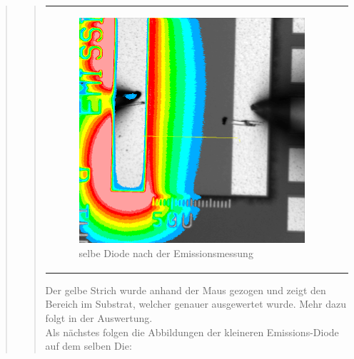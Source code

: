 \begin{quote}
\begin{quote}
\begin{center}
\begin{tabular}{ll}
\begin{minipage}{0.6\textwidth}
                         \begin{figure}[H]
                            \label{fig:asdfasdf}
                            \includegraphics[scale=0.25, trim = 0cm 0cm 0cm
                            0cm,
                            clip]{./Emissionsbilder/eins/nach_Emission_mit_Distanzen.png}
                            \caption{selbe Diode nach der Emissionsmessung}
                        \end{figure}
                   \vspace{-1.5em}

                    \end{minipage}

                \end{tabular}
                \end{center}

        \vspace{2em}

        Der gelbe Strich wurde anhand der Maus gezogen und zeigt den Bereich im
        Substrat, welcher genauer ausgewertet wurde. Mehr dazu folgt in der
        Auswertung.\\

        Als nächstes folgen die Abbildungen der kleineren Emissions-Diode auf
        dem selben Die:



\end{quote}
\end{quote}
